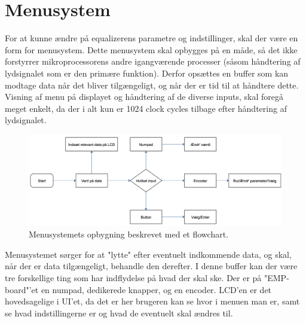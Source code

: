 \section{Menusystem}\label{sec:menu}
For at kunne ændre på equalizerens parametre og indstillinger, skal der være en form for menusystem. Dette menusystem skal opbygges på en måde, så det ikke forstyrrer mikroprocessorens andre igangværende processer (såsom håndtering af lydsignalet som er den primære funktion). Derfor opsættes en buffer som kan modtage data når det bliver tilgængeligt, og når der er tid til at håndtere dette. Visning af menu på displayet og håndtering af de diverse inputs, skal foregå meget enkelt, da der i alt kun er 1024 clock cycles tilbage efter håndtering af lydsignalet. \\

\begin{figure}[h]
	\centering
	\includegraphics[width=15cm]{billeder/ui_flowchart}
	\caption{Menusystemets opbygning beskrevet med et flowchart. }
\end{figure}

Menusystemet sørger for at "lytte" efter eventuelt indkommende data, og skal, når der er data tilgængeligt, behandle den derefter. I denne buffer kan der være tre forskellige ting som har indflydelse på hvad der skal ske. Der er på "EMP-board"'et en numpad, dedikerede knapper, og en encoder. LCD'en er det hovedsagelige i UI'et, da det er her brugeren kan se hvor i menuen man er, samt se hvad indstillingerne er og hvad de eventuelt skal ændres til.